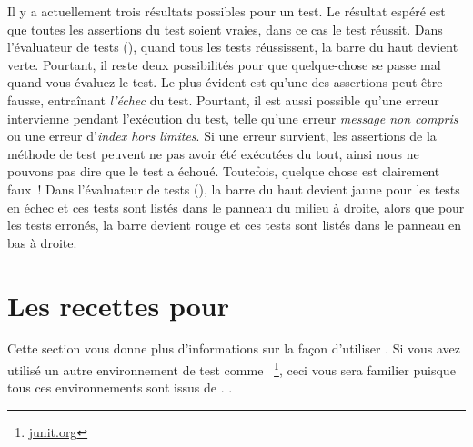 \documentclass[a4paper,10pt,twoside]{book}
\begin{document}
Il y a actuellement trois résultats possibles pour un test. Le résultat espéré est que toutes les assertions du test soient vraies, dans ce cas le test réussit. Dans l'évaluateur de tests (), quand tous les tests réussissent, la barre du haut devient verte. Pourtant, il reste deux possibilités pour que quelque-chose se passe mal quand vous évaluez le test. Le plus évident est qu'une des assertions peut être fausse, entraînant \emph{l'échec} du test. Pourtant, il est aussi possible qu'une erreur intervienne pendant l'exécution du test, telle qu'une erreur \emph{message non compris} ou une erreur d'\emph{index hors limites}. Si une erreur survient, les assertions de la méthode de test peuvent ne pas avoir été exécutées du tout, ainsi nous ne pouvons pas dire que le test a échoué. 
Toutefois, quelque chose est clairement faux~!
Dans l'évaluateur de tests (), la barre du haut devient jaune pour les tests en échec et ces tests sont listés dans le panneau du milieu à droite, alors que pour les tests erronés, la barre devient rouge et ces tests sont listés dans le panneau en bas à droite.

\section{Les recettes pour \SUnit}
Cette section vous donne plus d'informations sur la façon d'utiliser \SUnit. Si vous avez utilisé un autre environnement de test comme \JUnit~\footnote{\url{junit.org}}, ceci vous sera familier puisque tous ces environnements sont issus de  \SUnit. .
\end{document}
